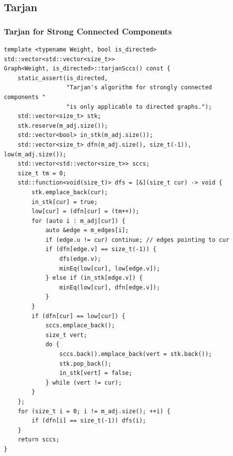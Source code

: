 \documentclass[UTF8]{article}
\begin{document}
\subsection{Tarjan}
\subsubsection{Tarjan for Strong Connected Components}
\begin{verbatim}
template <typename Weight, bool is_directed>
std::vector<std::vector<size_t>>
Graph<Weight, is_directed>::tarjanSccs() const {
	static_assert(is_directed,
				  "Tarjan's algorithm for strongly connected components "
				  "is only applicable to directed graphs.");
	std::vector<size_t> stk;
	stk.reserve(m_adj.size());
	std::vector<bool> in_stk(m_adj.size());
	std::vector<size_t> dfn(m_adj.size(), size_t(-1)), low(m_adj.size());
	std::vector<std::vector<size_t>> sccs;
	size_t tm = 0;
	std::function<void(size_t)> dfs = [&](size_t cur) -> void {
		stk.emplace_back(cur);
		in_stk[cur] = true;
		low[cur] = (dfn[cur] = (tm++));
		for (auto i : m_adj[cur]) {
			auto &edge = m_edges[i];
			if (edge.u != cur) continue; // edges pointing to cur
			if (dfn[edge.v] == size_t(-1)) {
				dfs(edge.v);
				minEq(low[cur], low[edge.v]);
			} else if (in_stk[edge.v]) {
				minEq(low[cur], dfn[edge.v]);
			}
		}
		if (dfn[cur] == low[cur]) {
			sccs.emplace_back();
			size_t vert;
			do {
				sccs.back().emplace_back(vert = stk.back());
				stk.pop_back();
				in_stk[vert] = false;
			} while (vert != cur);
		}
	};
	for (size_t i = 0; i != m_adj.size(); ++i) {
		if (dfn[i] == size_t(-1)) dfs(i);
	}
	return sccs;
}
\end{verbatim}
\end{document}
